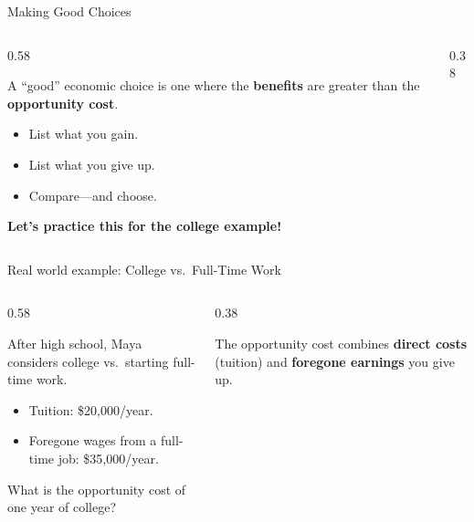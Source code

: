 \documentclass[9pt,english,aspectratio=169]{beamer}
\begin{document}
\begin{frame}{Making Good Choices}

  \begin{columns}[T]
    \begin{column}{0.58\textwidth}
      \begin{answerbox}
        A ``good'' economic choice is one where the \textbf{benefits}
        are greater than the \textbf{opportunity cost}.
      \end{answerbox}

      \vspace{0.6em}
      \begin{itemize}
        \item List what you gain.
        \item List what you give up.
        \item Compare---and choose.
      \end{itemize}

      \vspace{0.8em}
      \textbf{Let's practice this for the college example!}
    \end{column}
    \begin{column}{0.38\textwidth}
    \end{column}
  \end{columns}

\end{frame}

\begin{frame}{Real world example: College vs.\ Full-Time Work}

  \begin{columns}[T]
    \begin{column}{0.58\textwidth}
    \begin{questionbox}
      After high school, Maya considers college vs.\ starting full-time work.
      \begin{itemize}
        \item Tuition: \$20{,}000/year.
        \item Foregone wages from a full-time job: \$35{,}000/year.
      \end{itemize}
      \vspace{0.5em}
      What is the opportunity cost of one year of college?
     \end{questionbox}
    \end{column}
    \begin{column}{0.38\textwidth}
      \vspace{0.5em}
      \begin{insightbox}
        The opportunity cost combines \textbf{direct costs} (tuition) and \textbf{foregone earnings} you give up.
      \end{insightbox}
    \end{column}
  \end{columns}

\end{frame}
\end{document}
